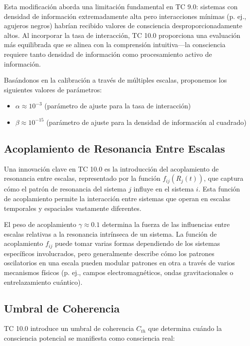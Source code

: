 \documentclass[12pt]{article}
\begin{document}
Esta modificación aborda una limitación fundamental en TC 9.0: sistemas con densidad de información extremadamente alta pero interacciones mínimas (p. ej., agujeros negros) habrían recibido valores de consciencia desproporcionadamente altos. Al incorporar la tasa de interacción, TC 10.0 proporciona una evaluación más equilibrada que se alinea con la comprensión intuitiva—la consciencia requiere tanto densidad de información como procesamiento activo de información.

Basándonos en la calibración a través de múltiples escalas, proponemos los siguientes valores de parámetros:
\begin{itemize}
    \item $\alpha \approx 10^{-3}$ (parámetro de ajuste para la tasa de interacción)
    \item $\beta \approx 10^{-15}$ (parámetro de ajuste para la densidad de información al cuadrado)
\end{itemize}

\subsection{Acoplamiento de Resonancia Entre Escalas}

Una innovación clave en TC 10.0 es la introducción del acoplamiento de resonancia entre escalas, representado por la función $f_{ij}(R_j(t))$, que captura cómo el patrón de resonancia del sistema $j$ influye en el sistema $i$. Esta función de acoplamiento permite la interacción entre sistemas que operan en escalas temporales y espaciales vastamente diferentes.

El peso de acoplamiento $\gamma \approx 0.1$ determina la fuerza de las influencias entre escalas relativas a la resonancia intrínseca de un sistema. La función de acoplamiento $f_{ij}$ puede tomar varias formas dependiendo de los sistemas específicos involucrados, pero generalmente describe cómo los patrones oscilatorios en una escala pueden modular patrones en otra a través de varios mecanismos físicos (p. ej., campos electromagnéticos, ondas gravitacionales o entrelazamiento cuántico).

\subsection{Umbral de Coherencia}

TC 10.0 introduce un umbral de coherencia $C_{th}$ que determina cuándo la consciencia potencial se manifiesta como consciencia real:
\end{document}

